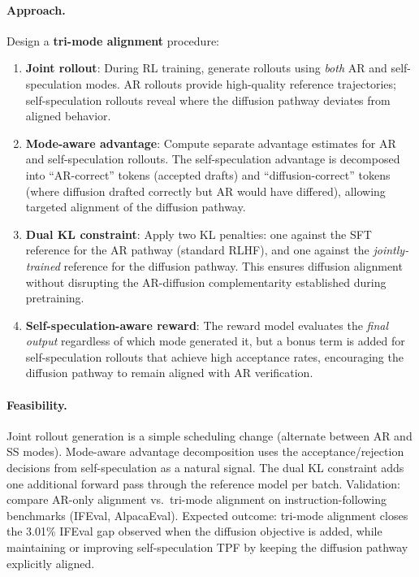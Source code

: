 \documentclass[11pt,a4paper]{article}
\begin{document}
\paragraph{Approach.} Design a \textbf{tri-mode alignment} procedure:
\begin{enumerate}
\item \textbf{Joint rollout}: During RL training, generate rollouts using \emph{both} AR and self-speculation modes. AR rollouts provide high-quality reference trajectories; self-speculation rollouts reveal where the diffusion pathway deviates from aligned behavior.
\item \textbf{Mode-aware advantage}: Compute separate advantage estimates for AR and self-speculation rollouts. The self-speculation advantage is decomposed into ``AR-correct'' tokens (accepted drafts) and ``diffusion-correct'' tokens (where diffusion drafted correctly but AR would have differed), allowing targeted alignment of the diffusion pathway.
\item \textbf{Dual KL constraint}: Apply two KL penalties: one against the SFT reference for the AR pathway (standard RLHF), and one against the \emph{jointly-trained} reference for the diffusion pathway. This ensures diffusion alignment without disrupting the AR-diffusion complementarity established during pretraining.
\item \textbf{Self-speculation-aware reward}: The reward model evaluates the \emph{final output} regardless of which mode generated it, but a bonus term is added for self-speculation rollouts that achieve high acceptance rates, encouraging the diffusion pathway to remain aligned with AR verification.
\end{enumerate}

\paragraph{Feasibility.} Joint rollout generation is a simple scheduling change (alternate between AR and SS modes). Mode-aware advantage decomposition uses the acceptance/rejection decisions from self-speculation as a natural signal. The dual KL constraint adds one additional forward pass through the reference model per batch. Validation: compare AR-only alignment vs.\ tri-mode alignment on instruction-following benchmarks (IFEval, AlpacaEval). Expected outcome: tri-mode alignment closes the 3.01\% IFEval gap observed when the diffusion objective is added, while maintaining or improving self-speculation TPF by keeping the diffusion pathway explicitly aligned.
\end{document}

